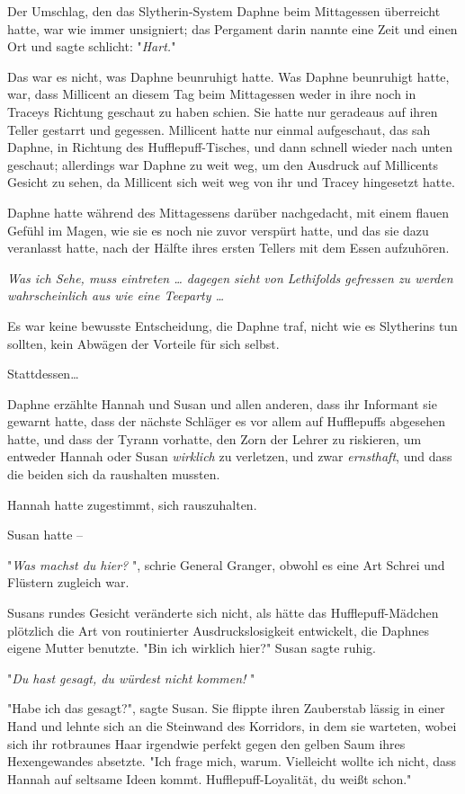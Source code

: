 {Der Umschlag, den das Slytherin-System Daphne beim Mittagessen überreicht hatte, war wie immer unsigniert; das Pergament darin nannte eine Zeit und einen Ort und sagte schlicht: "\emph{Hart.}"

Das war es nicht, was Daphne beunruhigt hatte. Was Daphne beunruhigt hatte, war, dass Millicent an diesem Tag beim Mittagessen weder in ihre noch in Traceys Richtung geschaut zu haben schien. Sie hatte nur geradeaus auf ihren Teller gestarrt und gegessen. Millicent hatte nur einmal aufgeschaut, das sah Daphne, in Richtung des Hufflepuff-Tisches, und dann schnell wieder nach unten geschaut; allerdings war Daphne zu weit weg, um den Ausdruck auf Millicents Gesicht zu sehen, da Millicent sich weit weg von ihr und Tracey hingesetzt hatte.

Daphne hatte während des Mittagessens darüber nachgedacht, mit einem flauen Gefühl im Magen, wie sie es noch nie zuvor verspürt hatte, und das sie dazu veranlasst hatte, nach der Hälfte ihres ersten Tellers mit dem Essen aufzuhören.

\emph{\emph{Was ich Sehe, muss eintreten … dagegen sieht von Lethifolds gefressen zu werden wahrscheinlich aus wie eine Teeparty …}}

Es war keine bewusste Entscheidung, die Daphne traf, nicht wie es Slytherins tun sollten, kein Abwägen der Vorteile für sich selbst.

Stattdessen…

Daphne erzählte Hannah und Susan und allen anderen, dass ihr Informant sie gewarnt hatte, dass der nächste Schläger es vor allem auf Hufflepuffs abgesehen hatte, und dass der Tyrann vorhatte, den Zorn der Lehrer zu riskieren, um entweder Hannah oder Susan \emph{wirklich} zu verletzen, und zwar \emph{ernsthaft}, und dass die beiden sich da raushalten mussten.

Hannah hatte zugestimmt, sich rauszuhalten.

Susan hatte --

"\emph{Was machst du hier?} ", schrie General Granger, obwohl es eine Art Schrei und Flüstern zugleich war.

Susans rundes Gesicht veränderte sich nicht, als hätte das Hufflepuff-Mädchen plötzlich die Art von routinierter Ausdruckslosigkeit entwickelt, die Daphnes eigene Mutter benutzte. "Bin ich wirklich hier?" Susan sagte ruhig.

"\emph{Du hast gesagt, du würdest nicht kommen!} "

"Habe ich das gesagt?", sagte Susan. Sie flippte ihren Zauberstab lässig in einer Hand und lehnte sich an die Steinwand des Korridors, in dem sie warteten, wobei sich ihr rotbraunes Haar irgendwie perfekt gegen den gelben Saum ihres Hexengewandes absetzte. "Ich frage mich, warum. Vielleicht wollte ich nicht, dass Hannah auf seltsame Ideen kommt. Hufflepuff-Loyalität, du weißt schon."

}
